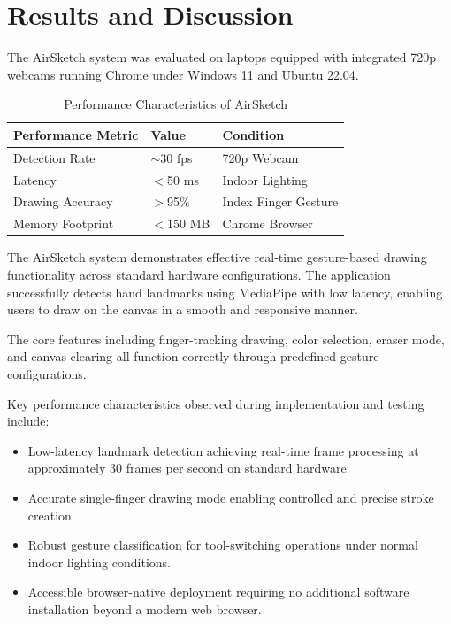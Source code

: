 \documentclass[conference]{IEEEtran}
\begin{document}
\section{Results and Discussion}

The AirSketch system was evaluated on laptops equipped with integrated 720p webcams running Chrome under Windows 11 and Ubuntu 22.04.

\begin{table}[h]
\caption{Performance Characteristics of AirSketch}
\centering
\renewcommand{\arraystretch}{1.3}
\begin{tabular}{|p{2.6cm}|p{1.5cm}|p{2.2cm}|}
\hline
\textbf{Performance Metric} & \textbf{Value} & \textbf{Condition} \\
\hline
Detection Rate & $\sim$30 fps & 720p Webcam \\
\hline
Latency & $<$50 ms & Indoor Lighting \\
\hline
Drawing Accuracy & $>$95\% & Index Finger Gesture \\
\hline
Memory Footprint & $<$150 MB & Chrome Browser \\
\hline
\end{tabular}
\end{table}

The AirSketch system demonstrates effective real-time gesture-based drawing functionality across standard hardware configurations. The application successfully detects hand landmarks using MediaPipe with low latency, enabling users to draw on the canvas in a smooth and responsive manner.

The core features including finger-tracking drawing, color selection, eraser mode, and canvas clearing all function correctly through predefined gesture configurations.

Key performance characteristics observed during implementation and testing include:

\begin{itemize}
    \item Low-latency landmark detection achieving real-time frame processing at approximately 30 frames per second on standard hardware.
    
    \item Accurate single-finger drawing mode enabling controlled and precise stroke creation.
    
    \item Robust gesture classification for tool-switching operations under normal indoor lighting conditions.
    
    \item Accessible browser-native deployment requiring no additional software installation beyond a modern web browser.
\end{itemize}
\end{document}
